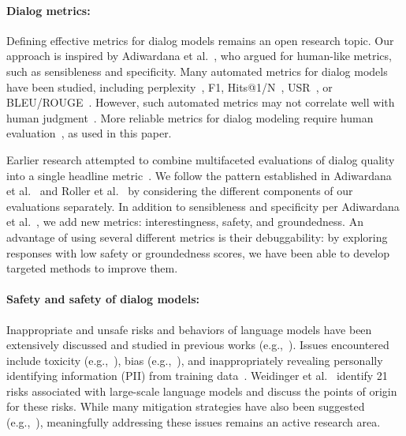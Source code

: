 \documentclass{article}
\begin{document}
\paragraph{Dialog metrics:} Defining effective metrics for dialog models remains an open research topic. Our approach is inspired by Adiwardana et al.~\cite{adiwardana2020humanlike}, who argued for human-like metrics, such as sensibleness and specificity. Many automated metrics for dialog models have been studied, including perplexity~\cite{NCM,adiwardana2020humanlike}, F1, Hits@1/N~\cite{dinan2020}, USR~\cite{mehri2020usr}, or BLEU/ROUGE~\cite{Papineni02bleu,sordoni2015neural,li2015diversity}. However, such automated metrics may not correlate well with human judgment~\cite{liu-etal-2016-evaluate}. More reliable metrics for dialog modeling require human evaluation~\cite{see-etal-2019-makes,li2019,blenderbot,dinan2020,adiwardana2020humanlike,nedelchev2020treating}, as used in this paper.

Earlier research attempted to combine multifaceted evaluations of dialog quality into a single headline metric~\cite{amazoneval}. We follow the pattern established in Adiwardana et al.~\cite{adiwardana2020humanlike} and Roller et al.~\cite{blenderbot} by considering the different components of our evaluations separately. In addition to sensibleness and specificity per Adiwardana et al.~\cite{adiwardana2020humanlike}, we add new metrics: interestingness, safety, and groundedness. An advantage of using several different metrics is their debuggability: by exploring responses with low safety or groundedness scores, we have been able to develop targeted methods to improve them.


\paragraph{Safety and safety of dialog models:} Inappropriate and unsafe risks and behaviors of language models have been extensively discussed and studied in previous works (e.g.,~\cite{dinan2021anticipating,weidinger2021ethical}). Issues encountered include toxicity (e.g.,~\cite{bulo2016dropout,mcguffie20,abid2021persistent}), bias (e.g.,~\cite{manwoman,basta-etal-2019-evaluating,kurita-etal-2019-measuring,hurtfulwords,sheng-etal-2019-woman,zhao-etal-2019-gender,guo2020detecting,prabhakaran2019perturbation,may2019measuring,sap-etal-2019-risk,bordia-bowman-2019-identifying,bender2021dangers,sap-etal-2020-social,hutchinson-etal-2020-social,abid2021large}), and inappropriately revealing personally identifying information (PII) from training data~\cite{carlini2020extracting}. Weidinger et al.~\cite{weidinger2021ethical} identify 21 risks associated with large-scale language models and discuss the points of origin for these risks. While many mitigation strategies have also been suggested (e.g.,~\cite{counterfactual,huang-etal-2020-reducing,jon20,qian-etal-2019-reducing,liang-etal-2020-towards,xu2020safetyrecipes,liu21,xu-etal-2021-bot,liang21}), meaningfully addressing these issues remains an active research area.
\end{document}

